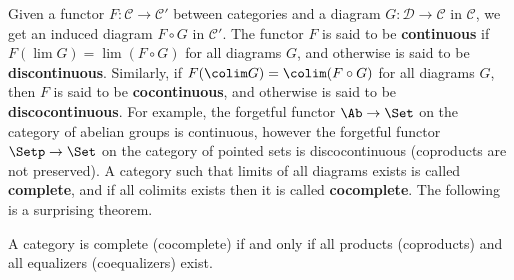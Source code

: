 Given a functor $F : \mathscr C \rightarrow \mathscr C'$ between categories and a diagram $G : \mathscr D \rightarrow \mathscr C$ in $\mathscr C$, we get an induced diagram $F \circ G$ in $\mathscr C'$. The functor $F$ is said to be \textbf{continuous} if $F(\lim G) = \lim(F \circ G)$ for all diagrams $G$, and otherwise is said to be \textbf{discontinuous}. Similarly, if $F(\colim G) = \colim(F \circ G)$ for all diagrams $G$, then $F$ is said to be \textbf{cocontinuous}, and otherwise is said to be \textbf{discocontinuous}. For example, the forgetful functor $\Ab \rightarrow \Set$ on the category of abelian groups is continuous, however the forgetful functor $\Setp \rightarrow \Set$ on the category of pointed sets is discocontinuous (coproducts are not preserved). A category such that limits of all diagrams exists is called \textbf{complete}, and if all colimits exists then it is called \textbf{cocomplete}. The following is a surprising theorem.
\begin{thm}
\label{complete and cocomplete characterization}
A category is complete (cocomplete) if and only if all products (coproducts) and all equalizers (coequalizers) exist.
\end{thm}

